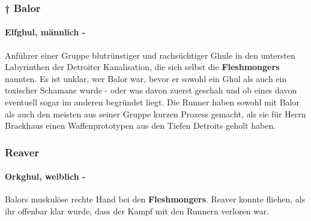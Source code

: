     \subsubsection{\textsf{†} Balor}
    \paragraph{Elfghul, männlich -} Anführer einer Gruppe blutrünstiger und rachsüchtiger Ghule in den untersten Labyrinthen der Detroiter Kanalisation, die sich selbst die \textbf{Fleshmongers} nannten. Es ist unklar, wer Balor war, bevor er sowohl ein Ghul als auch ein toxischer Schamane wurde - oder was davon zuerst geschah und ob eines davon eventuell sogar im anderen begründet liegt. Die Runner haben sowohl mit Balor als auch den meisten aus seiner Gruppe kurzen Prozess gemacht, als sie für Herrn Brackhaus einen Waffenprototypen aus den Tiefen Detroits geholt haben.
    
    \subsubsection{Reaver}
    \paragraph{Orkghul, weiblich -} Balors muskulöse rechte Hand bei den \textbf{Fleshmongers}. Reaver konnte fliehen, als ihr offenbar klar wurde, dass der Kampf mit den Runnern verloren war.

